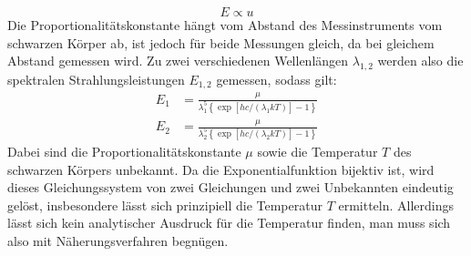 \begin{enumerate}[(a)]
\begin{equation}
E \propto u
\end{equation}
Die Proportionalitätskonstante hängt vom Abstand des Messinstruments vom schwarzen Körper ab, ist jedoch für beide Messungen gleich, da bei gleichem Abstand gemessen wird. Zu zwei verschiedenen Wellenlängen $\lambda_{1,2}$ werden also die spektralen Strahlungsleistungen $E_{1,2}$ gemessen, sodass gilt:
\begin{align}
E_1 &= \frac{\mu}{\lambda_1^5\left\{ \exp[hc/(\lambda_1 k T)]-1\right\}} \\
E_2 &= \frac{\mu}{\lambda_2^5\left\{ \exp[hc/(\lambda_2 k T)]-1\right\}}
\end{align}
Dabei sind die Proportionalitätskonstante $\mu$ sowie die Temperatur $T$ des schwarzen Körpers unbekannt. Da die Exponentialfunktion bijektiv ist, wird dieses Gleichungssystem von zwei Gleichungen und zwei Unbekannten eindeutig gelöst, insbesondere lässt sich prinzipiell die Temperatur $T$ ermitteln. Allerdings lässt sich kein analytischer Ausdruck für die Temperatur finden, man muss sich also mit Näherungsverfahren begnügen.



\end{enumerate}